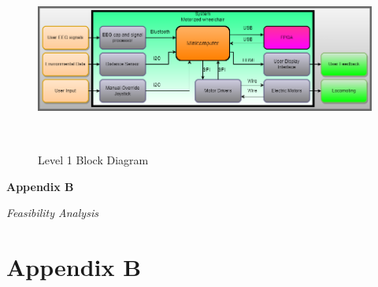 \documentclass[conference]{IEEEtran}
\begin{document}
    \begin{figure}[htbp]
            \centerline{\includegraphics[height=2.4in,keepaspectratio]{figs/A/Level_1_Diagram_Figure_A.3_2.png}}
            \caption{Level 1 Block Diagram}
            \label{fig:level-1}
        \end{figure}    
    \twocolumn

\clearpage
\onecolumn
\begin{center}
    \vspace*{5cm}
     {\Huge\bfseries Appendix B \par}
     \vspace{1cm}
    \textit{Feasibility Analysis} \\
\end{center}
\clearpage
\twocolumn
\setcounter{section}{2}
\renewcommand{\thesubsection}{B.\Alph{subsection}}

\section*{\textbf{Appendix B}}

    \setcounter{subsection}{0}
\end{document}

